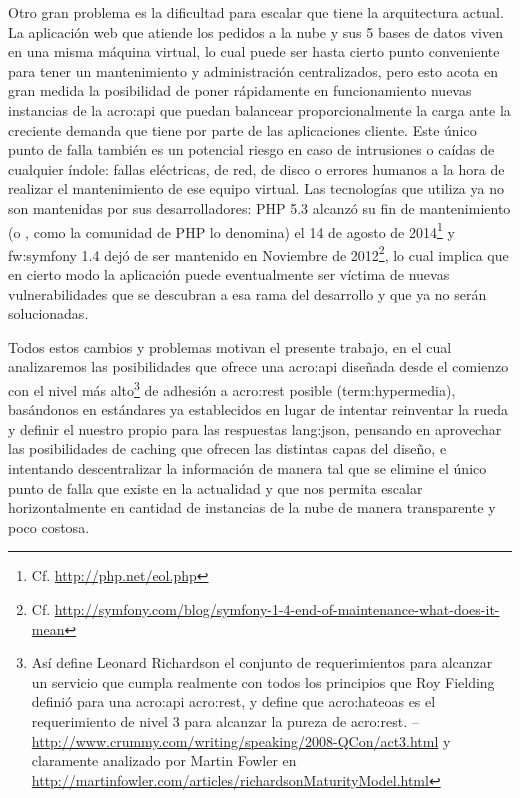 Otro gran problema es la dificultad para escalar que tiene la arquitectura actual. La aplicación web que atiende los pedidos a la nube y sus 5 bases de datos viven en una misma máquina virtual, lo cual puede ser hasta cierto punto conveniente para tener un mantenimiento y administración centralizados, pero esto acota en gran medida la posibilidad de poner rápidamente en funcionamiento nuevas instancias de la \gls{acro:api} que puedan balancear proporcionalmente la carga ante la creciente demanda que tiene por parte de las aplicaciones cliente. Este único punto de falla también es un potencial riesgo en caso de intrusiones o caídas de cualquier índole: fallas eléctricas, de red, de disco o errores humanos a la hora de realizar el mantenimiento de ese equipo virtual. Las tecnologías que utiliza ya no son mantenidas por sus desarrolladores: PHP 5.3 alcanzó su fin de mantenimiento (o , como la comunidad de PHP lo denomina) el 14 de agosto de 2014\footnote{Cf. \url{http://php.net/eol.php}} y \gls{fw:symfony} 1.4 dejó de ser mantenido en Noviembre de 2012\footnote{Cf. \url{http://symfony.com/blog/symfony-1-4-end-of-maintenance-what-does-it-mean}}, lo cual implica que en cierto modo la aplicación puede eventualmente ser víctima de nuevas vulnerabilidades que se descubran a esa rama del desarrollo y que ya no serán solucionadas.

Todos estos cambios y problemas motivan el presente trabajo, en el cual analizaremos las posibilidades que ofrece una \gls{acro:api} diseñada desde el comienzo con el nivel más alto\footnote{Así define Leonard Richardson el conjunto de requerimientos para alcanzar un servicio que cumpla realmente con todos los principios que Roy Fielding definió para una \gls{acro:api} \gls{acro:rest}, y define que \gls{acro:hateoas} es el requerimiento de nivel 3 para alcanzar la pureza de \gls{acro:rest}. – \url{http://www.crummy.com/writing/speaking/2008-QCon/act3.html} y claramente analizado por Martin Fowler en \url{http://martinfowler.com/articles/richardsonMaturityModel.html}} de adhesión a \gls{acro:rest} posible (\gls{term:hypermedia}), basándonos en estándares ya establecidos en lugar de intentar reinventar la rueda y definir el nuestro propio para las respuestas \gls{lang:json}, pensando en aprovechar las posibilidades de caching que ofrecen las distintas capas del diseño, e intentando descentralizar la información de manera tal que se elimine el único punto de falla que existe en la actualidad y que nos permita escalar horizontalmente en cantidad de instancias de la nube de manera transparente y poco costosa.
